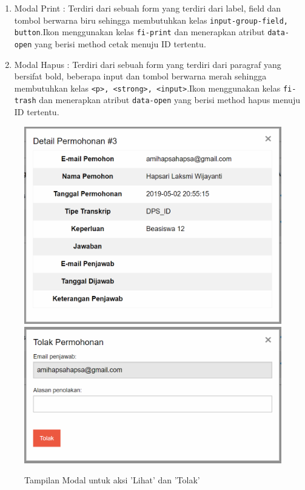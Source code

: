 \documentclass[a4paper,twoside]{article}
\begin{document}
\begin{enumerate}
\begin{enumerate}
			\item Modal Print : Terdiri dari sebuah form yang terdiri dari label, field dan tombol berwarna biru sehingga membutuhkan kelas \verb|input-group-field, button|.Ikon menggunakan kelas \texttt{fi-print} dan menerapkan atribut \texttt{data-open} yang berisi method cetak menuju ID tertentu.
			
			\item Modal Hapus : Terdiri dari sebuah form yang terdiri dari paragraf yang bersifat bold, beberapa input dan tombol berwarna merah sehingga membutuhkan kelas \verb|<p>, <strong>, <input>|.Ikon menggunakan kelas \texttt{fi-trash} dan menerapkan atribut \texttt{data-open} yang berisi method hapus menuju ID tertentu.
		\end{enumerate}
		
		\begin{figure} [H]
			\centering  
			\includegraphics[scale=0.5]{Modal-Lihat-Manajemen-Cetak-Transkrip.png}  
			\includegraphics[scale=0.5]{Modal-Tolak-Manajemen-Cetak-Transkrip.png} 
			\caption{Tampilan Modal untuk aksi 'Lihat' dan 'Tolak'} 	
		\end{figure}
		

\end{enumerate}
\end{document}
